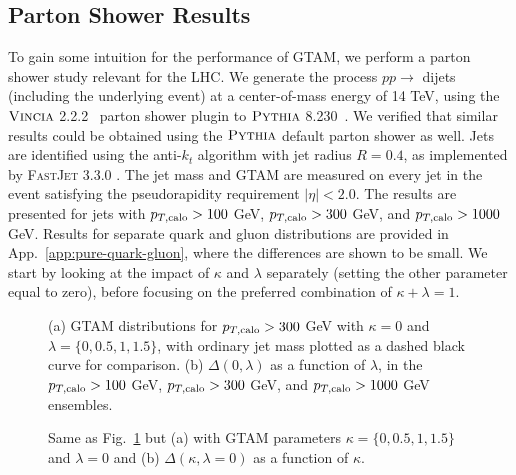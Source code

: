\documentclass[letterpaper,11pt]{article}
\newcommand{\Fig}[1]{Fig.~\ref{#1}}
\newcommand{\App}[1]{App.~\ref{#1}}
\begin{document}


\subsection{Parton Shower Results}
\label{sec:MCexplore-results}

To gain some intuition for the performance of GTAM, we perform a parton shower study relevant for the LHC.
%
We generate the process $pp\rightarrow$ dijets (including the underlying event) at a center-of-mass energy of 14 TeV, using the $\textsc{Vincia}$ 2.2.2~\cite{Giele:2007di,Fischer:2016vfv} parton shower plugin to $\textsc{Pythia}$ 8.230~\cite{Sjostrand:2006za,Sjostrand:2014zea}.
%
We verified that similar results could be obtained using the $\textsc{Pythia}$ default parton shower as well.
%
Jets are identified using the anti-$k_t$ algorithm \cite{Cacciari:2008gp} with jet radius $R=0.4$, as implemented by \textsc{FastJet} 3.3.0 \cite{Cacciari:2005hq,Cacciari:2011ma}.
%
The jet mass and GTAM are measured on every jet in the event satisfying the pseudorapidity requirement $\vert \eta \vert < 2.0$.
%
The results are presented for jets with $p_{T,\rm calo} > 100$ GeV, $p_{T,\rm calo} > 300$ GeV, and $p_{T,\rm calo} > 1000$ GeV.
%
Results for separate quark and gluon distributions are provided in \App{app:pure-quark-gluon}, where the differences are shown to be small.
%
We start by looking at the impact of $\kappa$ and $\lambda$ separately (setting the other parameter equal to zero), before focusing on the preferred combination of $\kappa + \lambda = 1$.

\begin{figure}
	\centering
	\caption{(a) GTAM distributions for $p_{T,\rm calo} > 300$ GeV with $\kappa = 0$ and $\lambda = \{0,0.5,1,1.5 \}$, with ordinary jet mass plotted as a dashed black curve for comparison.  (b) $\Delta(0,\lambda)$ as a function of $\lambda$, in the $p_{T,\rm calo} > 100$ GeV, $p_{T,\rm calo} > 300$ GeV, and $p_{T,\rm calo} > 1000$ GeV ensembles.}
	\label{fig:mc-panel-1}
\end{figure}
	
\begin{figure}
	\centering
	\caption{Same as \Fig{fig:mc-panel-1} but (a) with GTAM parameters $\kappa = \{0,0.5,1,1.5 \}$ and $\lambda = 0$ and (b) $\Delta(\kappa,\lambda=0)$ as a function of $\kappa$. }
	\label{fig:mc-panel-2}
\end{figure}
\end{document}
